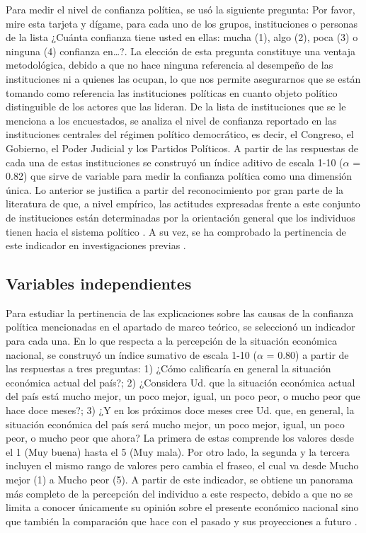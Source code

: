 \documentclass[12pt,twoside]{templates/facsothesis}
\begin{document}
Para medir el nivel de confianza política, se usó la siguiente pregunta: Por favor, mire esta tarjeta y dígame, para cada uno de los grupos, instituciones o personas de la lista ¿Cuánta confianza tiene usted en ellas: mucha (1), algo (2), poca (3) o ninguna (4) confianza en\ldots?. La elección de esta pregunta constituye una ventaja metodológica, debido a que no hace ninguna referencia al desempeño de las instituciones ni a quienes las ocupan, lo que nos permite asegurarnos que se están tomando como referencia las instituciones políticas en cuanto objeto político distinguible de los actores que las lideran. De la lista de instituciones que se le menciona a los encuestados, se analiza el nivel de confianza reportado en las instituciones centrales del régimen político democrático, es decir, el Congreso, el Gobierno, el Poder Judicial y los Partidos Políticos. A partir de las respuestas de cada una de estas instituciones se construyó un índice aditivo de escala 1-10 (\(\alpha\) = 0.82) que sirve de variable para medir la confianza política como una dimensión única. Lo anterior se justifica a partir del reconocimiento por gran parte de la literatura de que, a nivel empírico, las actitudes expresadas frente a este conjunto de instituciones están determinadas por la orientación general que los individuos tienen hacia el sistema político \citep{marienMeasuringPoliticalTrust2013, zmerliPoliticalTrust2022}. A su vez, se ha comprobado la pertinencia de este indicador en investigaciones previas \citep[ej.][]{bargstedSocialPoliticalTrust2023, zmerliIncomeInequalityDistributive2015}.

\subsection{Variables independientes}\label{variables-independientes}

Para estudiar la pertinencia de las explicaciones sobre las causas de la confianza política mencionadas en el apartado de marco teórico, se seleccionó un indicador para cada una. En lo que respecta a la percepción de la situación económica nacional, se construyó un índice sumativo de escala 1-10 (\(\alpha\) = 0.80) a partir de las respuestas a tres preguntas: 1) ¿Cómo calificaría en general la situación económica actual del país?; 2) ¿Considera Ud. que la situación económica actual del país está mucho mejor, un poco mejor, igual, un poco peor, o mucho peor que hace doce meses?; 3) ¿Y en los próximos doce meses cree Ud. que, en general, la situación económica del país será mucho mejor, un poco mejor, igual, un poco peor, o mucho peor que ahora? La primera de estas comprende los valores desde el 1 (Muy buena) hasta el 5 (Muy mala). Por otro lado, la segunda y la tercera incluyen el mismo rango de valores pero cambia el fraseo, el cual va desde Mucho mejor (1) a Mucho peor (5). A partir de este indicador, se obtiene un panorama más completo de la percepción del individuo a este respecto, debido a que no se limita a conocer únicamente su opinión sobre el presente económico nacional sino que también la comparación que hace con el pasado y sus proyecciones a futuro \citep{saldanazunigaConfianzaInstitucionesPoliticas2019}.
\end{document}
